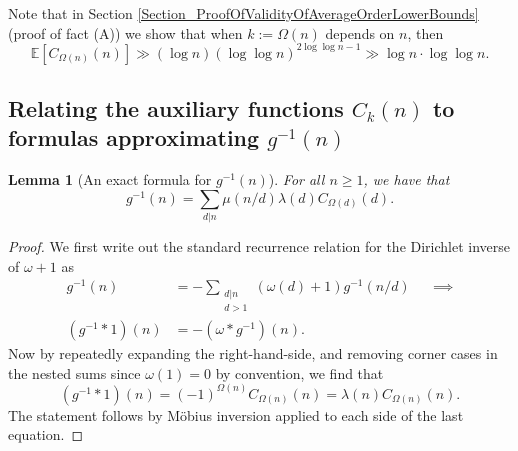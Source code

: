\documentclass[11pt,reqno,a4letter]{article}
\numberwithin{figure}{section}
\numberwithin{table}{section}
\theoremstyle{plain}
\newtheorem{lemma}[theorem]{Lemma}
\numberwithin{theorem}{section}
\theoremstyle{definition}
\begin{document}
Note that in Section \ref{Section_ProofOfValidityOfAverageOrderLowerBounds} 
(proof of fact (A)) we show that when $k := \Omega(n)$ depends on $n$, then 
\[
\mathbb{E}[C_{\Omega(n)}(n)] \gg (\log n) (\log\log n)^{2\log\log n - 1} \gg \log n \cdot \log\log n.  
\]

\subsection{Relating the auxiliary functions $C_k(n)$ to formulas approximating $g^{-1}(n)$} 

\begin{lemma}[An exact formula for $g^{-1}(n)$] 
\label{lemma_AnExactFormulaFor_gInvByMobiusInv_v1} 
For all $n \geq 1$, we have that 
\[
g^{-1}(n) = \sum_{d|n} \mu(n/d) \lambda(d) C_{\Omega(d)}(d). 
\]
\end{lemma}
\begin{proof} 
We first write out the standard recurrence relation for the Dirichlet inverse of 
$\omega+1$ as 
\begin{align*} 
g^{-1}(n) & = - \sum_{\substack{d|n \\ d>1}} (\omega(d) + 1) g^{-1}(n/d) && \implies \\ 
     (g^{-1} \ast 1)(n) & = -(\omega \ast g^{-1})(n). 
\end{align*} 
Now by repeatedly expanding the right-hand-side, and removing corner cases in the nested sums since 
$\omega(1) = 0$ by convention, we find that 
\[
(g^{-1} \ast 1)(n) = (-1)^{\Omega(n)} C_{\Omega(n)}(n) = \lambda(n) C_{\Omega(n)}(n). 
\]
The statement follows by M\"obius inversion applied to each side of the last equation. 
\end{proof} 
\end{document}
